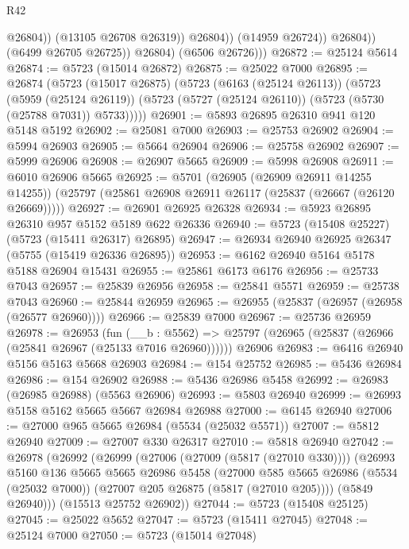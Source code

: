 \begin{lexlean}{R42}
\begin{coremodule}
                            @26804))
                        (@13105 @26708 @26319))
                      @26804))
                  (@14959 @26724))
                @26804))
            (@6499 @26705 @26725))
          @26804)
        (@6506 @26726)))
@26872 := @25124 @5614
@26874 := @5723 (@15014 @26872)
@26875 := @25022 @7000
@26895 := @26874
    (@5723
      (@15017 @26875)
      (@5723
        (@6163 (@25124 @26113))
        (@5723
          (@5959 (@25124 @26119))
          (@5723 (@5727 (@25124 @26110)) (@5723 (@5730 (@25788 @7031)) @5733)))))
@26901 := @5893 @26895 @26310 @941 @120 @5148 @5192
@26902 := @25081 @7000
@26903 := @25753 @26902
@26904 := @5994 @26903
@26905 := @5664 @26904
@26906 := @25758 @26902
@26907 := @5999 @26906
@26908 := @26907 @5665
@26909 := @5998 @26908
@26911 := @6010 @26906 @5665
@26925 := @5701
    (@26905 (@26909 @26911 @14255 @14255))
    (@25797 (@25861 @26908 @26911 @26117 (@25837 (@26667 (@26120 @26669)))))
@26927 := @26901 @26925 @26328
@26934 := @5923 @26895 @26310 @957 @5152 @5189 @622 @26336
@26940 := @5723 (@15408 @25227) (@5723 (@15411 @26317) @26895)
@26947 := @26934 @26940 @26925 @26347 (@5755 (@15419 @26336 @26895))
@26953 := @6162 @26940 @5164 @5178 @5188 @26904 @15431
@26955 := @25861 @6173 @6176
@26956 := @25733 @7043
@26957 := @25839 @26956
@26958 := @25841 @5571
@26959 := @25738 @7043
@26960 := @25844 @26959
@26965 := @26955 (@25837 (@26957 (@26958 (@26577 @26960))))
@26966 := @25839 @7000
@26967 := @25736 @26959
@26978 := @26953
    (fun (__b : @5562) => @25797 (@26965 (@25837 (@26966 (@25841 @26967 (@25133 @7016 @26960))))))
    @26906
@26983 := @6416 @26940 @5156 @5163 @5668 @26903
@26984 := @154 @25752
@26985 := @5436 @26984
@26986 := @154 @26902
@26988 := @5436 @26986 @5458
@26992 := @26983 (@26985 @26988) (@5563 @26906)
@26993 := @5803 @26940
@26999 := @26993 @5158 @5162 @5665 @5667 @26984 @26988
@27000 := @6145 @26940
@27006 := @27000 @965 @5665 @26984 (@5534 (@25032 @5571))
@27007 := @5812 @26940
@27009 := @27007 @330 @26317
@27010 := @5818 @26940
@27042 := @26978
    (@26992
      (@26999
        (@27006 (@27009 (@5817 (@27010 @330))))
        (@26993
          @5160
          @136
          @5665
          @5665
          @26986
          @5458
          (@27000
            @585
            @5665
            @26986
            (@5534 (@25032 @7000))
            (@27007 @205 @26875 (@5817 (@27010 @205))))
          (@5849 @26940)))
      (@15513 @25752 @26902))
@27044 := @5723 (@15408 @25125)
@27045 := @25022 @5652
@27047 := @5723 (@15411 @27045)
@27048 := @25124 @7000
@27050 := @5723 (@15014 @27048)

\end{coremodule}
\end{lexlean}
